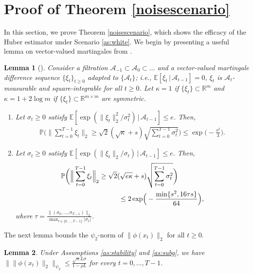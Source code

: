\documentclass[letterpaper,10pt,conference]{ieeeconf}
\theoremstyle{plain} %
\newtheorem{lemma}{Lemma}
\theoremstyle{plain} %
\theoremstyle{plain} %
\theoremstyle{plain}
\begin{document}
\section{Proof of Theorem \ref{noisescenario}}\label{sec:proofthm1}

In this section, we prove Theorem \ref{noisescenario}, which shows the efficacy of the Huber estimator under Scenario \ref{as:white}. 
We begin by presenting a useful lemma on vector-valued martingales from \cite{juditsky2008large}. 

\begin{lemma}[\cite{juditsky2008large}]\label{vectorvalued}
Consider a filtration $ \mathcal{A}_{-1}\subset \mathcal{A}_0\subset \dots$ and a vector-valued martingale difference sequence $\{\xi_t\}_{t\ge 0}$ adapted to $\{\mathcal{A}_{t}\}$; \textit{i.e.}, $\mathbb{E}[\xi_t \,|\,\mathcal{A}_{t-1}] = 0$, $\xi_t$ is $\mathcal{A}_{t}$-measurable and square-integrable for all $t\ge 0$. Let $\kappa =1$ if $\{\xi_t\}\subset\mathbb{R}^m$ and $\kappa = 1+2\log m$ if $\{\xi_t\}\subset \mathbb{R}^{m\times m}$ are symmetric.
\begin{enumerate}[leftmargin=0.45cm]
    \item Let $\sigma_t\ge 0$ satisfy $\mathbb{E}[\exp (\|\xi_t\|_2^2 / \sigma_t^2)\,|\,\mathcal{A}_{t-1}] \le e$.  Then,
    \begin{align*}
        \mathbb{P}\biggr(\Bigr\|\sum_{t=0}^{T-1} \xi_t \Bigr\|_2 \ge \sqrt{2}(\sqrt{\kappa} + s) \sqrt{\sum_{t=0}^{T-1} \sigma_t^2}  \biggr) \le \exp\Bigr(-\frac{s^2}{3}\Bigr).
    \end{align*}
    \item  Let $\sigma_t\ge 0$ satisfy  $\mathbb{E}[\exp (\|\xi_t\|_2 / \sigma_t)\,|\,\mathcal{A}_{t-1}] \le e$. Then,
    \begin{align*}
      &  \mathbb{P}\biggr(\Bigr\|\sum_{t=0}^{T-1} \xi_t \Bigr\|_2 \ge \sqrt{2}(\sqrt{e\kappa}+s) \sqrt{\sum_{t=0}^{T-1} \sigma_t^2}  \biggr) \\&\hspace{30mm}\le 2\exp\Bigr(-\frac{\min\{s^2, 16\tau s\}}{64}\Bigr),
    \end{align*}
    where $\tau = \frac{\|(\sigma_0,\dots, \sigma_{T-1})\|_2}{\max_{t\in\{0,\dots, T-1\}} |\sigma_t|}$.
\end{enumerate}
\end{lemma}

The next lemma bounds the $\psi_2$-norm of $\|\phi(x_t)\|_2 $ for all $t\ge 0$.

\begin{lemma}\label{phixtnorm}
   Under Assumptions  \ref{as:stability} and \ref{as:subg}, we have $\bigr\| \| \phi(x_t) \|_2\bigr\|_{\psi_2}\le \frac{ \sqrt{n}L \sigma}{1-\rho L}$
   for every $t=0,\dots, T-1$.
\end{lemma}
\end{document}
